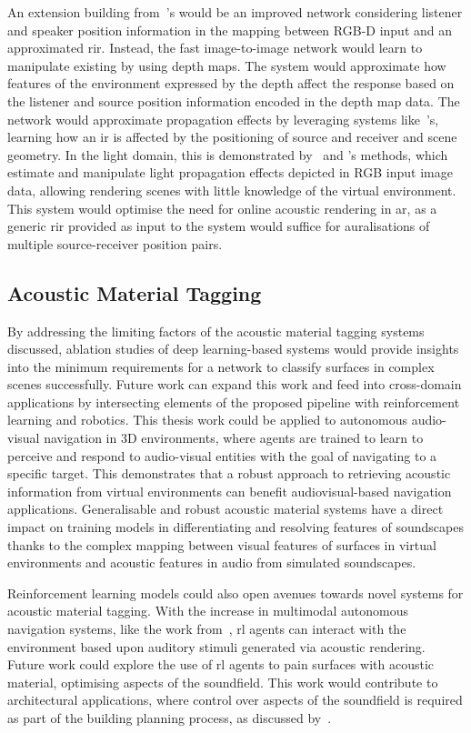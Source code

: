 An extension building from~\cite{Singh_2021_ICCV}'s would be an improved network considering listener and speaker position information in the mapping between RGB-D input and an approximated \acrshort{rir}. Instead, the fast image-to-image network would learn to manipulate existing  by using depth maps. The system would approximate how features of the environment expressed by the depth affect the response based on the listener and source position information encoded in the depth map data. The network would approximate propagation effects by leveraging systems like~\cite{chen2022soundspaces}'s, learning how an \acrshort{ir} is affected by the positioning of source and receiver and scene geometry. In the light domain, this is demonstrated by~\cite{wang2020deep} and \cite{gardner2019deep}'s methods, which estimate and manipulate light propagation effects depicted in RGB input image data, allowing rendering scenes with little knowledge of the virtual environment. This system would optimise the need for online acoustic rendering in \acrshort{ar}, as a generic \acrshort{rir} provided as input to the system would suffice for auralisations of multiple source-receiver position pairs.\par

\subsection{Acoustic Material Tagging}
By addressing the limiting factors of the acoustic material tagging systems discussed, ablation studies of deep learning-based systems would provide insights into the minimum requirements for a network to classify surfaces in complex scenes successfully.
Future work can expand this work and feed into cross-domain applications by intersecting elements of the proposed pipeline with reinforcement learning and robotics. This thesis work could be applied to autonomous audio-visual navigation in 3D environments, where agents are trained to learn to perceive and respond to audio-visual entities with the goal of navigating to a specific target. This demonstrates that a robust approach to retrieving acoustic information from virtual environments can benefit audiovisual-based navigation applications. Generalisable and robust acoustic material systems have a direct impact on training models in differentiating and resolving features of soundscapes thanks to the complex mapping between visual features of surfaces in virtual environments and acoustic features in audio from simulated soundscapes.\par
Reinforcement learning models could also open avenues towards novel systems for acoustic material tagging. With the increase in multimodal autonomous navigation systems, like the work from~\cite{chen2022soundspaces}, \acrshort{rl} agents can interact with the environment based upon auditory stimuli generated via acoustic rendering. Future work could explore the use of \acrshort{rl} agents to pain surfaces with acoustic material, optimising aspects of the soundfield. This work would contribute to architectural applications, where control over aspects of the soundfield is required as part of the building planning process, as discussed by~\cite{vorlander2015virtual}.\par


